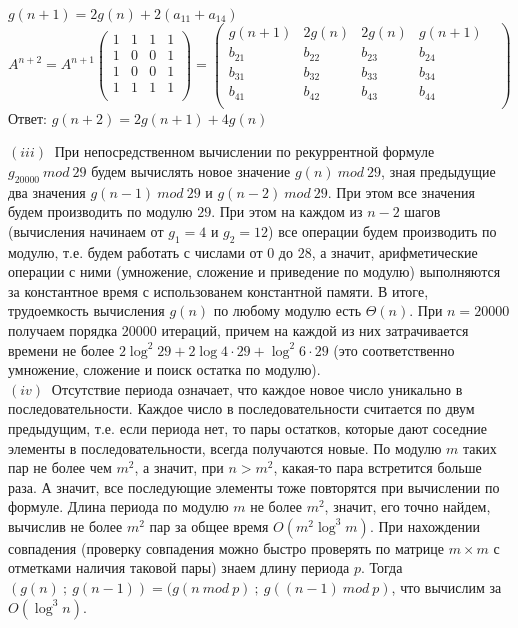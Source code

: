 \documentclass[a4paper,12pt]{article} %
\begin{document}
  $g(n+1) = 2g(n) + 2(a_{11}+a_{14})$
 \\
 
 $A^{n+2} = A^{n+1}\begin{pmatrix}
 1&1&1&1\\
 1&0&0&1\\
 1&0&0&1\\
 1&1&1&1\\
 \end{pmatrix} = \begin{pmatrix}
 g(n+1)&2g(n)&2g(n)&g(n+1)&\\
 b_{21}&b_{22}&b_{23}&b_{24}&\\
 b_{31}&b_{32}&b_{33}&b_{34}&\\
 b_{41}&b_{42}&b_{43}&b_{44}&\\
 \end{pmatrix}$\\
 
 
 Ответ:
 $g(n+2) = 2g(n+1)+ 4g(n)$
 
$(iii)~$ При непосредственном вычислении по рекуррентной формуле $g_{20000}~mod~29$ будем вычислять новое значение $g(n)~mod~29$, зная предыдущие два значения $g(n-1)~mod~29$ и $g(n-2)~mod~29$. При этом все значения будем производить по модулю $29$. При этом на каждом из $n-2$ шагов (вычисления начинаем от $g_1 = 4$ и $g_2 = 12$) все операции будем производить по модулю, т.е. будем работать с числами от $0$ до $28$, а значит, арифметические операции с ними (умножение, сложение и приведение по модулю) выполняются за константное время с использованем константной памяти. В итоге, трудоемкость вычисления $g(n)$ по любому модулю есть $\Theta(n)$. При $n = 20 000$ получаем порядка $20 000$ итераций, причем на каждой из них затрачивается времени не более $2\log^2 {29}+2\log{4 \cdot 29} + \log^2{6\cdot 29}$ (это соответственно умножение, сложение и поиск остатка по модулю).\\
$(iv)~$ Отсутствие периода означает, что каждое новое число уникально в последовательности. Каждое число в последовательности считается по двум предыдущим, т.е. если периода нет, то пары остатков, которые дают соседние элементы в последовательности, всегда получаются новые. По модулю $m$ таких пар не более чем $m^2$, а значит, при $n > m^2$, какая-то пара встретится больше раза. А значит, все последующие элементы тоже повторятся при вычислении по формуле. Длина периода по модулю $m$ не более $m^2$, значит, его точно найдем, вычислив не более $m^2$ пар за общее время $O(m^2 \log^3{m})$. При нахождении совпадения (проверку совпадения можно быстро проверять по матрице $m\times m$ с отметками наличия таковой пары) знаем длину периода $p$. Тогда $ (g(n)~;~g(n-1)) = (g(n~mod~p)~;~g((n-1)~mod~p)$, что вычислим за $O(\log^3{n})$. \\
\end{document}
